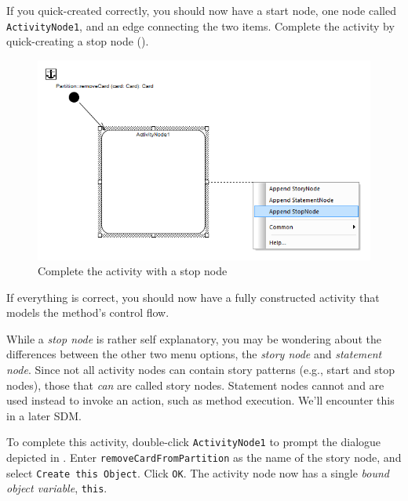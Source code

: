 \begin{stepbystep}
\item If you quick-created correctly, you should now have a start node, one node called \texttt{ActivityNode1}, and an edge
connecting the two items. Complete the activity by quick-creating a stop node ().

\begin{figure}[htp]
\begin{center}
  \includegraphics[width=\textwidth]{../../org.moflon.doc.handbook.03_storyDiagrams/03_removeCard/visRemImages/ea_sdmAppendStopNode}
  \caption{Complete the activity with a stop node}  
  \label{ea:sdm_stop_node}
\end{center}
\end{figure}

\vspace{0.5cm}

\item If everything is correct, you should now have a fully constructed activity that models the method's control flow.

\item While a \emph{stop node} is rather self explanatory, you may be wondering about the differences between the other two menu options,
the \emph{story node} and \emph{statement node}. Since not all activity nodes can contain story patterns (e.g., start
and stop nodes), those that \emph{can} are called story nodes. Statement nodes cannot and are used instead to invoke an action, such as method execution. We'll
encounter this in a later SDM.

\item To complete this activity, double-click \texttt{ActivityNode1} to prompt the dialogue depicted in
. Enter \texttt{removeCardFromPartition} as the name of the story node, and select \texttt{Create this Object}.  Click
\texttt{OK}. The activity node now has a single \emph{bound} \emph{object variable}, \texttt{this}.


\end{stepbystep}
